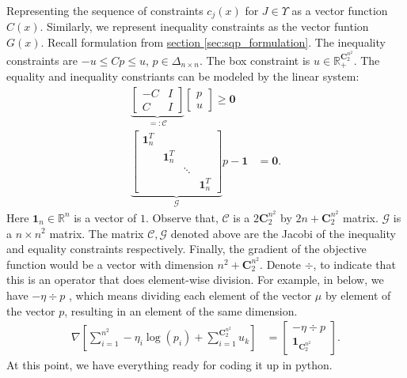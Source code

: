 \documentclass[11pt]{article}
\theoremstyle{definition}
\numberwithin{equation}{subsection}
\begin{document}
        Representing the sequence of constraints $c_j(x)$ for $J \in \Upsilon$ as a vector function $C(x)$. 
        Similarly, we represent inequality constraints as the vector funtion $G(x)$. 
        Recall formulation from \hyperref[sec:sqp_formulation]{section \ref*{sec:sqp_formulation}}. 
        The inequality constraints are $-u \le Cp \le u$, $p \in \Delta_{n\times n}$. 
        The box constraint is $u\in \mathbb R_+^{\mathbf C_2^{n^2}}$. 
        The equality and inequality constriants can be modeled by the linear system: 
        \begin{align*}
            \underbrace{\begin{bmatrix}
                -C & I
                \\
                C & I
            \end{bmatrix}}_{=: \mathcal C}
            \begin{bmatrix}
                p \\ u
            \end{bmatrix}
            \ge
            \mathbf 0 
            \\
            \underbrace{
                \begin{bmatrix}
                    \mathbf 1_n^T  & & &
                    \\
                    & \mathbf 1_n^T & &
                    \\
                    & & \ddots & 
                    \\
                    & & & \mathbf 1_n^T
                \end{bmatrix}
            }_{\mathcal G}
            p - \mathbf 1 &= \mathbf 0 .
        \end{align*}
        Here $\mathbf 1_n \in \mathbb R^n$ is a vector of $1$. 
        Observe that, $\mathcal C$ is a $2 \mathbf C_2^{n^2}$ by $2n + \mathbf C_2^{n^2}$ matrix. 
        $\mathcal G$ is a $n\times n^2$ matrix. 
        The matrix $\mathcal C, \mathcal G$ denoted above are the Jacobi of the inequality and equality constraints respectively. 
        Finally, the gradient of the objective function would be a vector with dimension $n^2 + \mathbf C_2^{n^2}$. 
        \newcommand{\elew}[1]{\;\textbf{#1}}
        Denote $\div$, to indicate that this is an operator that does element-wise division.
        For example, in below, we have $-\eta\div p$ , which means dividing each element of the vector $\mu$ by element of the vector $p$, resulting in an element of the same dimension. 
        \begin{align}
            \nabla \left[
                \sum_{i = 1}^{n^2} - \eta_{i} \log(p_i)
                + 
                \sum_{i = 1}^{\mathbf C_2^{n^2}} u_k
            \right]&= 
            \begin{bmatrix}
                -\eta \div p
                \\
                \mathbf 1_{\mathbf C_2^{n^2}}
            \end{bmatrix}. 
        \end{align}
        At this point, we have everything ready for coding it up in python. 
        





        


\appendix



\end{document}

